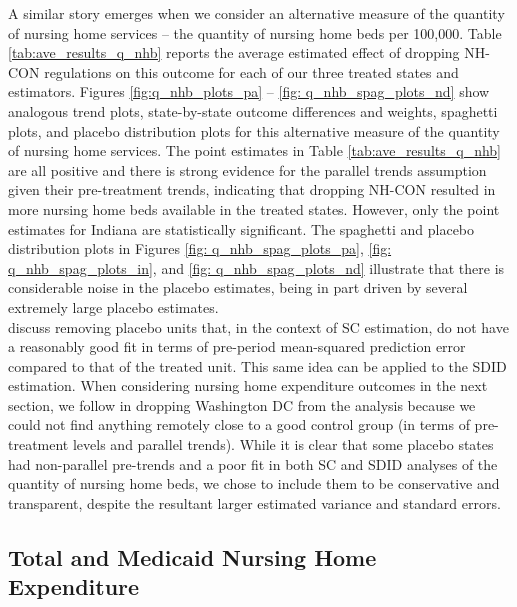 \documentclass[../Main.tex]{subfiles}
\begin{document}
\indent A similar story emerges when we consider an alternative measure of the quantity of nursing home services -- the quantity of nursing home beds per 100,000. Table \ref{tab:ave_results_q_nhb} reports the average estimated effect of dropping NH-CON regulations on this outcome for each of our three treated states and estimators. Figures \ref{fig:q_nhb_plots_pa} -- \ref{fig: q_nhb_spag_plots_nd} show analogous trend plots, state-by-state outcome differences and weights, spaghetti plots, and placebo distribution plots for this alternative measure of the quantity of nursing home services. The point estimates in Table \ref{tab:ave_results_q_nhb} are all positive and there is strong evidence for the parallel trends assumption given their pre-treatment trends, indicating that dropping NH-CON resulted in more nursing home beds available in the treated states. However, only the point estimates for Indiana are statistically significant. The spaghetti and placebo distribution plots in Figures \ref{fig: q_nhb_spag_plots_pa}, \ref{fig: q_nhb_spag_plots_in}, and \ref{fig: q_nhb_spag_plots_nd} illustrate that there is considerable noise in the placebo estimates, being in part driven by several extremely large placebo estimates.\\
\indent \citet{abadie2010synthetic} discuss removing placebo units that, in the context of SC estimation, do not have a reasonably good fit in terms of pre-period mean-squared prediction error compared to that of the treated unit. This same idea can be applied to the SDID estimation. When considering nursing home expenditure outcomes in the next section, we follow \citet{abadie2010synthetic} in dropping Washington DC from the analysis because we could not find anything remotely close to a good control group (in terms of pre-treatment levels and parallel trends). While it is clear that some placebo states had non-parallel pre-trends and a poor fit in both SC and SDID analyses of the quantity of nursing home beds, we chose to include them to be conservative and transparent, despite the resultant larger estimated variance and standard errors.

\subsection{Total and Medicaid Nursing Home Expenditure}
\end{document}
